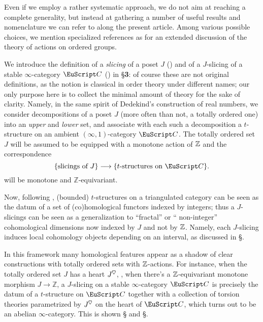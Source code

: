 Even if we employ a rather systematic approach, we do not aim at reaching a complete generality, but instead at gathering a number of useful results and nomenclature we can refer to along the present article. Among various possible choices, we mention specialized references as \cite{blyth2005lattices, glass1999partially, Fuch63} for an extended discussion of the theory of actions on ordered groups.

We introduce the definition of a \emph{slicing} of a poset $J$ (\adef{}) and of a $J$-slicing of a stable $\infty$-category $\C$ (\adef{}) in §\textbf{3}: of course these are not original definitions, as the notion is classical in order theory under different names; our only purpose here is to collect the minimal amount of theory for the sake of clarity. Namely, in the same spirit of Dedekind's construction of real numbers, we consider decompositions of a poset $J$ (more often than not, a totally ordered one) into an \emph{upper} and \emph{lower} set, and associate with each such a decomposition a $t$-structure on an ambient $(\infty,1)$-category $\C$. The totally ordered set $J$ will be assumed to be equipped with a monotone action of $\mathbb{Z}$ and the correspondence
\[
\{\text{slicings of $J$}\} \to \{\text{$t$-structures on $\C$}\}.
\]
will be monotone and $\mathbb{Z}$-equivariant.

Now, following \cite{BBDPervers}, (bounded) $t$-structures on a triangulated category can be seen as the datum of a set of (co)homological functors indexed by integers;  thus a $J$-slicings can be seen as a generalization to ``fractal'' or `` non-integer'' cohomological dimensions now indexed by $J$ and not by $\mathbb{Z}$. Namely, each $J$-slicing induces local cohomology objects depending on an interval, as discussed in §. 

In this framework many homological features appear as a shadow of clear constructions with totally ordered sets with $\mathbb{Z}$-actions. For instance, when the totally ordered set $J$ has a heart $J^\heart$, \ie, when there's a $\mathbb{Z}$-equivariant monotone morphism $J \to \mathbb{Z}$, a $J$-slicing on a stable $\infty$-category $\C$ is precisely the datum of a $t$-structure on $\C$ together with a collection of torsion theories parametrized by $J^\heart$ on the heart of $\C$, which turns out to be an abelian $\infty$-category. This is shown § and §. 

